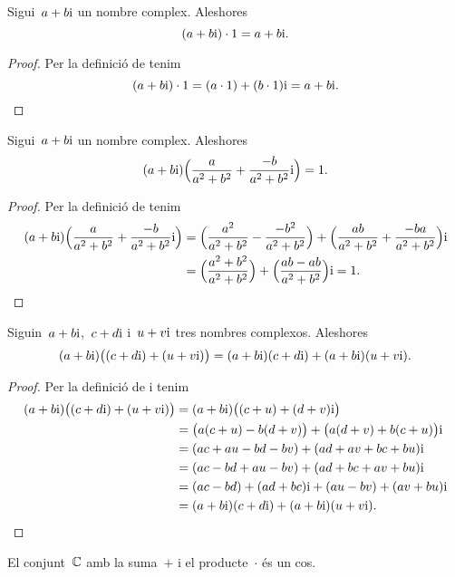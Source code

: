\documentclass[../../main.tex]{subfiles}
\begin{document}
    \begin{proposition}
        \label{prop:element neutre pel producte dels complexos}
        Sigui~\(a+b\mathrm{i}\) un nombre complex.
        Aleshores
        \[
            (a+b\mathrm{i})\cdot1 = a+b\mathrm{i}.
        \]
    \end{proposition}
    \begin{proof}
        Per la definició de  tenim
        \[
            (a+b\mathrm{i})\cdot1 = (a\cdot1)+(b\cdot1)\mathrm{i} = a+b\mathrm{i}.\qedhere
        \]
    \end{proof}
    \begin{proposition}
        \label{prop:element invers pel producte de nombres complexos}
        Sigui~\(a+b\mathrm{i}\) un nombre complex.
        Aleshores
        \[
            (a+b\mathrm{i})\Big(\frac{a}{a^{2}+b^{2}} + \frac{-b}{a^{2}+b^{2}}\mathrm{i}\Big)
            = 1.
        \]
    \end{proposition}
    \begin{proof}
        Per la definició de  tenim
        \begin{align*}
            (a+b\mathrm{i})\Big(\frac{a}{a^{2}+b^{2}}+\frac{-b}{a^{2}+b^{2}}\mathrm{i}\Big)
                &= \Big(\frac{a^{2}}{a^{2}+b^{2}}-\frac{-b^{2}}{a^{2}+b^{2}}\Big)
                   +\Big(\frac{ab}{a^{2}+b^{2}}+\frac{-ba}{a^{2}+b^{2}}\Big)\mathrm{i} \\
                &= \Big(\frac{a^{2}+b^{2}}{a^{2}+b^{2}}\Big)
                   +\Big(\frac{ab-ab}{a^{2}+b^{2}}\Big)\mathrm{i} = 1.\qedhere
        \end{align*}
    \end{proof}
    \begin{proposition}
        \label{prop:distribuitva del producte respecte la suma de nombres complexos}
        Siguin~\(a+b\mathrm{i}\),~\(c+d\mathrm{i}\) i~\(u+v\mathrm{i}\) tres nombres complexos.
        Aleshores
        \[
            (a+b\mathrm{i})\big((c+d\mathrm{i})+(u+v\mathrm{i})\big) = (a+b\mathrm{i})(c+d\mathrm{i})+(a+b\mathrm{i})(u+v\mathrm{i}).
        \]
    \end{proposition}
    \begin{proof}
        Per la definició de 
        i  tenim
        \begin{align*}
            (a+b\mathrm{i})\big((c+d\mathrm{i})+(u+v\mathrm{i})\big)
                &= (a+b\mathrm{i})\big((c+u)+(d+v)\mathrm{i}\big) \\
                &= \big(a(c+u)-b(d+v)\big)+\big(a(d+v)+b(c+u)\big)\mathrm{i} \\
                &= (ac+au-bd-bv)+(ad+av+bc+bu)\mathrm{i} \\
                &= (ac-bd+au-bv)+(ad+bc+av+bu)\mathrm{i}\\
                &= (ac-bd)+(ad+bc)\mathrm{i}+(au-bv)+(av+bu)\mathrm{i} \\
                &= (a+b\mathrm{i})(c+d\mathrm{i})+(a+b\mathrm{i})(u+v\mathrm{i}).\qedhere
        \end{align*}
    \end{proof}
    \begin{corollary}
        \label{cor:els complexos formen un cos}
        El conjunt~\(\mathbb{C}\) amb la suma~\(+\)
        i el producte~\(\cdot\) és un cos.
    \end{corollary}
\end{document}
